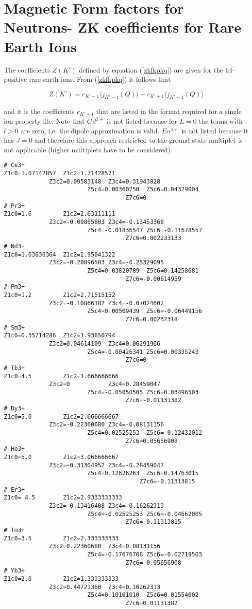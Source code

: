 \section{Magnetic Form factors for Neutrons- ZK coefficients for Rare Earth Ions}\label{zk}

The coefficients $Z(K')$ defined by equation (\ref{zkfkpkq}) are given for 
the tri-positive rare earth ions. From (\ref{zkfkpkq}) it follows that

\begin{equation}
Z(K')=c_{K'-1} \langle j_{K'-1}(Q) \rangle+c_{K'+1} \langle  j_{K'+1}(Q) \rangle 
\end{equation}

and  it is the coefficients $c_{K'\pm 1}$ that are listed in the format required
for a single ion property file. Note that $Gd^{3+}$ is not listed because 
for $L=0$ the terms with $l>0$ are zero, i.e. the dipole approximation is 
valid. $Eu^{3+}$ is not listed because it has $J=0$ and therefore this
approach restricted to the ground state multiplet is not applicable (higher multiplets
have to be considered).


{\footnotesize
\begin{verbatim}
# Ce3+
Z1c0=1.07142857  Z1c2=1.71428571
		     Z3c2=0.09583148  Z3c4=0.31943828 
					    Z5c4=0.00360750  Z5c6=0.04329004 
								   Z7c6=0          
# Pr3+
Z1c0=1.6         Z1c2=2.63111111
		     Z3c2=-0.09865803 Z3c4=-0.13453368
					    Z5c4=-0.01836547 Z5c6=-0.11678557
								   Z7c6=0.002233133
# Nd3+
Z1c0=1.63636364  Z1c2=2.95041322
		     Z3c2=-0.20896503 Z3c4=-0.25329095
					    Z5c4=0.03820789  Z5c6=0.14258681
								   Z7c6=-0.00614959
# Pm3+
Z1c0=1.2         Z1c2=2.71515152 
		     Z3c2=-0.10866182 Z3c4=-0.07024602
					    Z5c4=0.00509439  Z5c6=-0.06449156
								   Z7c6=0.00232318 
# Sm3+
Z1c0=0.35714286  Z1c2=1.93650794 
		     Z3c2=0.04614109  Z3c4=0.06291966
					    Z5c4=-0.00426341 Z5c6=0.00335243
								   Z7c6=0          
# Tb3+
Z1c0=4.5         Z1c2=1.666666666
		     Z3c2=0           Z3c4=0.28459047
					    Z5c4=-0.05050505 Z5c6=0.03496503
								   Z7c6=-0.01131382
# Dy3+
Z1c0=5.0         Z1c2=2.666666667
		     Z3c2=-0.22360680 Z3c4=-0.08131156
					    Z5c4=0.02525253  Z5c6=-0.12432012
								   Z7c6=0.05656908 
# Ho3+
Z1c0=5.0         Z1c2=3.066666667
		     Z3c2=-0.31304952 Z3c4=-0.28459047
					    Z5c4=0.12626263  Z5c6=0.14763015
					    			   Z7c6=-0.11313815
# Er3+
Z1c0= 4.5        Z1c2=2.9333333333
		     Z3c2=-0.13416408 Z3c4=-0.16262313
					    Z5c4=-0.02525253 Z5c6=-0.04662005
								   Z7c6= 0.11313815
# Tm3+
Z1c0=3.5         Z1c2=2.333333333
		     Z3c2=0.22360680  Z3c4=0.08131156
					    Z5c4=-0.17676768 Z5c6=-0.02719503
								   Z7c6=-0.05656908
# Yb3+
Z1c0=2.0         Z1c2=1.333333333
		     Z3c2=0.44721360  Z3c4=0.16262313
					    Z5c4=0.10101010  Z5c6=0.01554002
								   Z7c6=0.01131382 
\end{verbatim}
}